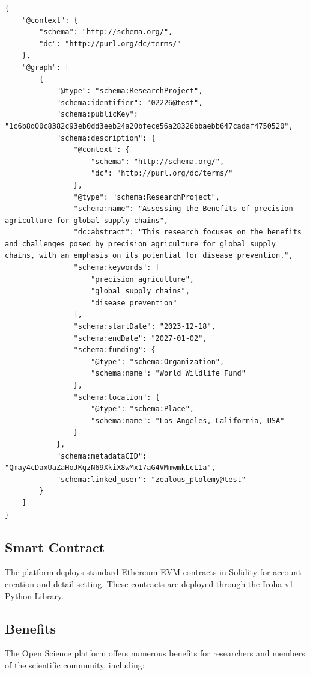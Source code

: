 \documentclass{article}
\begin{document}
\begin{verbatim}
{
    "@context": {
        "schema": "http://schema.org/",
        "dc": "http://purl.org/dc/terms/"
    },
    "@graph": [
        {
            "@type": "schema:ResearchProject",
            "schema:identifier": "02226@test",
            "schema:publicKey": "1c6b8d00c8382c93eb0dd3eeb24a20bfece56a28326bbaebb647cadaf4750520",
            "schema:description": {
                "@context": {
                    "schema": "http://schema.org/",
                    "dc": "http://purl.org/dc/terms/"
                },
                "@type": "schema:ResearchProject",
                "schema:name": "Assessing the Benefits of precision agriculture for global supply chains",
                "dc:abstract": "This research focuses on the benefits and challenges posed by precision agriculture for global supply chains, with an emphasis on its potential for disease prevention.",
                "schema:keywords": [
                    "precision agriculture",
                    "global supply chains",
                    "disease prevention"
                ],
                "schema:startDate": "2023-12-18",
                "schema:endDate": "2027-01-02",
                "schema:funding": {
                    "@type": "schema:Organization",
                    "schema:name": "World Wildlife Fund"
                },
                "schema:location": {
                    "@type": "schema:Place",
                    "schema:name": "Los Angeles, California, USA"
                }
            },
            "schema:metadataCID": "Qmay4cDaxUaZaHoJKqzN69XkiX8wMx17aG4VMmwmkLcL1a",
            "schema:linked_user": "zealous_ptolemy@test"
        }
    ]
}
\end{verbatim}



\subsection{Smart Contract}

The platform deploys standard Ethereum EVM contracts in Solidity for account creation and detail setting. These contracts are deployed through the Iroha v1 Python Library.

\subsection{Benefits}

The Open Science platform offers numerous benefits for researchers and members of the scientific community, including:
\end{document}
